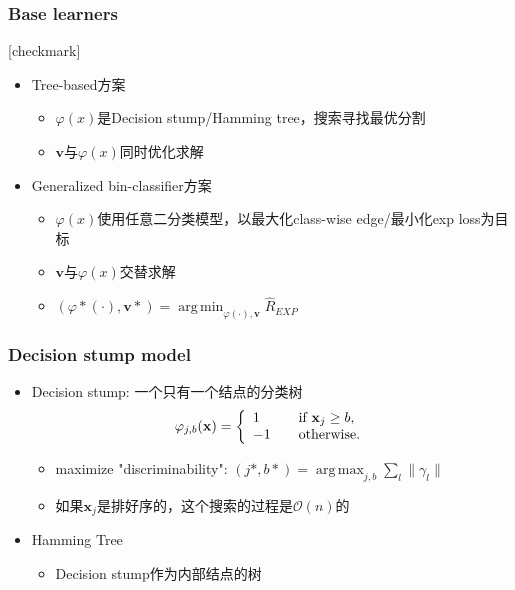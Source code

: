 \documentclass{beamer}
\DeclareMathOperator*{\argmin}{arg\,min}
\DeclareMathOperator*{\argmax}{arg\,max}
\begin{document}
\begin{frame}
\frametitle{Base learners}
{
  [checkmark]
  \begin{itemize}
    \item Tree-based方案
      \begin{itemize}
        \item $\varphi(x)$是Decision stump/Hamming tree，搜索寻找最优分割
        \item $\mathbf{v}$与$\varphi(x)$同时优化求解
      \end{itemize}
    \item Generalized bin-classifier方案
      \begin{itemize}
        \item $\varphi(x)$使用任意二分类模型，以最大化class-wise edge/最小化exp loss为目标
        \item $\mathbf{v}$与$\varphi(x)$交替求解
        \item $(\varphi*(\cdot),\mathbf{v}*) = \argmin_{\varphi(\cdot), \mathbf{v}} \hat{R}_{EXP}$
      \end{itemize}
  \end{itemize}
}
\end{frame}

\begin{frame}
\frametitle{Decision stump model}
\begin{itemize}
\item Decision stump: 一个只有一个结点的分类树
$$ \varphi_{j,b}(\mathbf{x}) = \left\{
  \begin{array}{l l}
    1 & \quad \text{if } \mathbf{x}_j \geq b, \\
    -1 & \quad \text{otherwise.}
  \end{array} \right.$$
  \begin{itemize}
    \item maximize "discriminability": $(j*,b*) = \argmax_{j,b} \sum_{l}\| \gamma_l \|$
    \item 如果$\mathbf{x}_j$是排好序的，这个搜索的过程是$\mathcal{O}(n)$的
  \end{itemize}
\item Hamming Tree
  \begin{itemize}
    \item Decision stump作为内部结点的树
  \end{itemize}
\end{itemize}
\end{frame}
\end{document}
